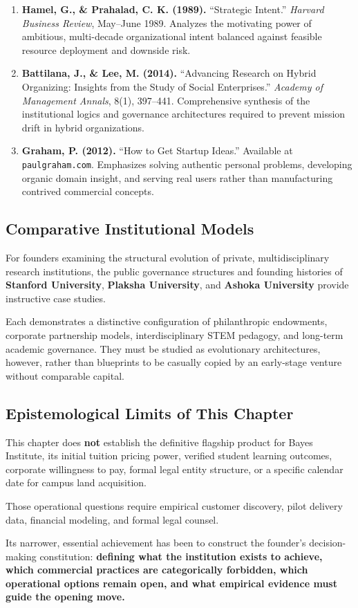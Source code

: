 \begin{enumerate}[leftmargin=12pt,itemsep=3pt,topsep=1pt,parsep=0pt]
  \item \textbf{Hamel, G., \& Prahalad, C. K. (1989).} ``Strategic Intent.'' \textit{Harvard Business Review}, May--June 1989. Analyzes the motivating power of ambitious, multi-decade organizational intent balanced against feasible resource deployment and downside risk.
  \item \textbf{Battilana, J., \& Lee, M. (2014).} ``Advancing Research on Hybrid Organizing: Insights from the Study of Social Enterprises.'' \textit{Academy of Management Annals}, 8(1), 397--441. Comprehensive synthesis of the institutional logics and governance architectures required to prevent mission drift in hybrid organizations.
  \item \textbf{Graham, P. (2012).} ``How to Get Startup Ideas.'' Available at \texttt{paulgraham.com}. Emphasizes solving authentic personal problems, developing organic domain insight, and serving real users rather than manufacturing contrived commercial concepts.
\end{enumerate}

\subsection{Comparative Institutional Models}

For founders examining the structural evolution of private, multidisciplinary research institutions, the public governance structures and founding histories of \textbf{Stanford University}, \textbf{Plaksha University}, and \textbf{Ashoka University} provide instructive case studies.

Each demonstrates a distinctive configuration of philanthropic endowments, corporate partnership models, interdisciplinary STEM pedagogy, and long-term academic governance. They must be studied as evolutionary architectures, however, rather than blueprints to be casually copied by an early-stage venture without comparable capital.

\subsection{Epistemological Limits of This Chapter}

This chapter does \textbf{not} establish the definitive flagship product for Bayes Institute, its initial tuition pricing power, verified student learning outcomes, corporate willingness to pay, formal legal entity structure, or a specific calendar date for campus land acquisition.

Those operational questions require empirical customer discovery, pilot delivery data, financial modeling, and formal legal counsel.

Its narrower, essential achievement has been to construct the founder's decision-making constitution: \textbf{defining what the institution exists to achieve, which commercial practices are categorically forbidden, which operational options remain open, and what empirical evidence must guide the opening move.}
